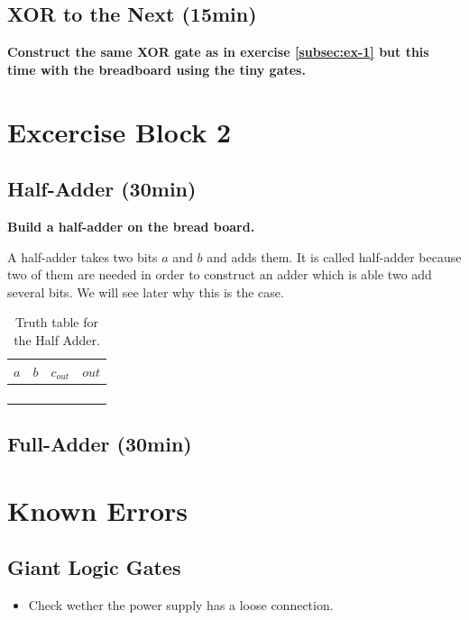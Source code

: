 \documentclass[10pt,a4paper]{article}
\begin{document}
\subsection{XOR to the Next (15min)}
\textbf{Construct the same XOR gate as in exercise \ref{subsec:ex-1} but this time with the breadboard using the tiny gates.}


\section{Excercise Block 2}

\subsection{Half-Adder (30min)}
\textbf{Build a half-adder on the bread board.}

A half-adder takes two bits $a$ and $b$ and adds them. It is called half-adder because two of them are needed in order to construct an adder which is able two add several bits. We will see later why this is the case.
\begin{table}[H]
	\centering
	\begin{tabular}{|c|c||c|c|}
		\hline
		$a$ & $b$ & $c_{out}$ & $out$ \\ \hline
		&     &           &       \\ \hline
		&     &           &       \\ \hline
		&     &           &       \\ \hline
		&     &           &       \\ \hline
	\end{tabular}
	\caption{Truth table for the Half Adder.}
	\label{tab:half-adder-truth-table}
\end{table}

\subsection{Full-Adder (30min)}

\newpage
\section{Known Errors}
\subsection{Giant Logic Gates}
\begin{itemize}
	\item Check wether the power supply has a loose connection.
\end{itemize}
\end{document}
